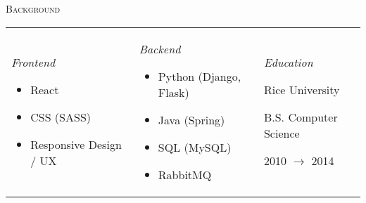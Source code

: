 \documentclass[11pt]{amsart}
\begin{document}
\bigskip
\textsc{Background}

\begin{tabularx}{\textwidth}{@{}X X X@{}}
\textit{Frontend}
\bigskip
\begin{itemize}[noitemsep, leftmargin=2em, label=\raisebox{0.25ex}{\tiny$\bullet$}]
\item React
\item CSS (SASS)
\item Responsive Design / UX
\end{itemize}
& 
\textit{Backend} 
\bigskip
\begin{itemize}[noitemsep, leftmargin=2em, label=\raisebox{0.25ex}{\tiny$\bullet$}]
\item Python (Django, Flask)
\item Java (Spring)
\item SQL (MySQL)
\item RabbitMQ
\end{itemize}

 &
 \textit{Education} 
 \bigskip
 
Rice University

B.S. Computer Science

 2010 $\rightarrow$  2014

\end{tabularx}
\endgroup
\end{document}
